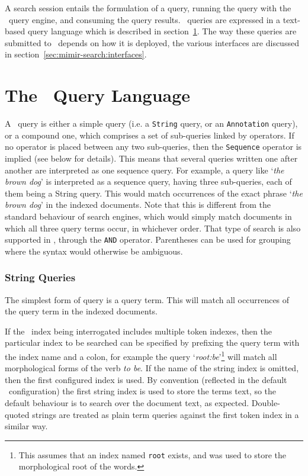 A search session entails the formulation of a query, running the query with the
\Mimir\ query engine, and consuming the query results.  \Mimir\ queries are
expressed in a text-based query language which is described in
section~\ref{sec:mimir-search:ql}.  The way these queries are submitted to \Mimir\
depends on how it is deployed, the various interfaces are discussed in
section~\ref{sec:mimir-search:interfaces}.


\section{The \Mimir\ Query Language}\label{sec:mimir-search:ql}

A \Mimir\ query is either a simple query (i.e. a {\tt String} query,
or an {\tt Annotation} query), or a compound one, 
which comprises a set of
sub-queries linked by operators. If no operator is placed between any two
sub-queries, then the {\tt Sequence} operator is implied (see below for details). 
This means that several queries
written one after another are interpreted as one sequence query. For example, a
query like `{\it the brown dog}' is interpreted as a sequence query, having
three sub-queries, each of them being a String query. This would match
occurrences of the exact phrase `{\it the brown dog}' in the indexed documents.
Note that this is different from the standard behaviour of search engines,
which would simply match documents in which all three query terms occur, in
whichever order. That type of search is also supported in \Mimir, through the
{\tt AND} operator.  
Parentheses can be used
for grouping where the syntax would otherwise be ambiguous.

\subsubsection{String Queries}\label{sec:mimir-search:string-query}

The simplest form of query is a query term. This will match all occurrences of
the query term in the indexed documents.

If the \Mimir\ index being interrogated includes multiple token indexes, then
the particular index to be searched can be specified by prefixing the query
term with the index name and a colon, for example the query
`{\it root:be}'\footnote{This assumes that an index named {\tt root} exists,
and was used to store the morphological root of the words.} will match all
morphological forms of the verb {\it to be}. If the name of the string index is
omitted, then the first configured index is used. By convention (reflected in
the default \Mimir\ configuration) the first string index is used to store the
terms text, so the default behaviour is to search over the document text, as
expected.  Double-quoted strings are treated as plain term queries against the
first token index in a similar way.


